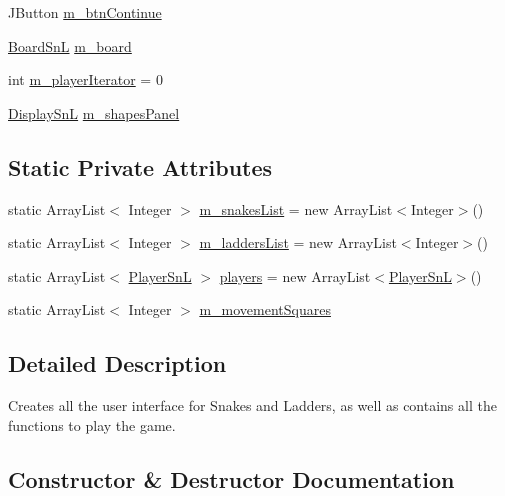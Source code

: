 \begin{DoxyCompactItemize}
\item 
J\+Button \hyperlink{class_game_1_1_game_sn_l_a6e2e15971627fbc196ed207742a79e44}{m\+\_\+btn\+Continue}
\item 
\hyperlink{class_board_1_1_board_sn_l}{Board\+Sn\+L} \hyperlink{class_game_1_1_game_sn_l_a9cb06e53592cfc48ca485c25ab9c1e42}{m\+\_\+board}
\item 
int \hyperlink{class_game_1_1_game_sn_l_a4cff3283ef1f344a871b2019ae92dd57}{m\+\_\+player\+Iterator} = 0
\item 
\hyperlink{class_display_1_1_display_sn_l}{Display\+Sn\+L} \hyperlink{class_game_1_1_game_sn_l_af35fcedb0f8206713981e01068c3f281}{m\+\_\+shapes\+Panel}
\end{DoxyCompactItemize}
\subsection*{Static Private Attributes}
\begin{DoxyCompactItemize}
\item 
static Array\+List$<$ Integer $>$ \hyperlink{class_game_1_1_game_sn_l_a904b75e06e59aa1a9c028a948f98e33e}{m\+\_\+snakes\+List} = new Array\+List$<$Integer$>$()
\item 
static Array\+List$<$ Integer $>$ \hyperlink{class_game_1_1_game_sn_l_a0b47e32e0960ed988d341b31b5f3bd3b}{m\+\_\+ladders\+List} = new Array\+List$<$Integer$>$()
\item 
static Array\+List$<$ \hyperlink{class_player_1_1_player_sn_l}{Player\+Sn\+L} $>$ \hyperlink{class_game_1_1_game_sn_l_a942dda31e02524f87962efa42b2c2642}{players} = new Array\+List$<$\hyperlink{class_player_1_1_player_sn_l}{Player\+Sn\+L}$>$()
\item 
static Array\+List$<$ Integer $>$ \hyperlink{class_game_1_1_game_sn_l_af8c7ff07d44c8713db098772d7888478}{m\+\_\+movement\+Squares}
\end{DoxyCompactItemize}


\subsection{Detailed Description}
Creates all the user interface for Snakes and Ladders, as well as contains all the functions to play the game. 

\subsection{Constructor \& Destructor Documentation}
\hypertarget{class_game_1_1_game_sn_l_a76663e6331e7f09bdb0baaf6d3f28b2f}{}

